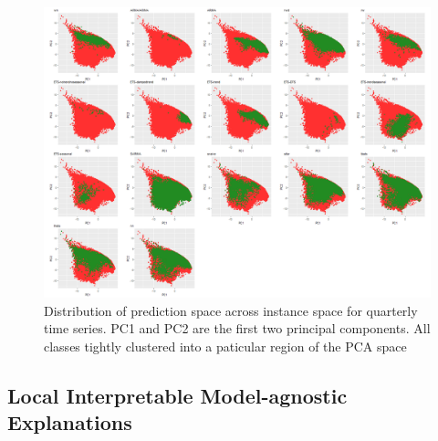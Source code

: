 \documentclass[11pt,a4paper,]{article}
\begin{document}
\begin{figure}
\centering
\includegraphics{figures/quarterlypca-1.png}
\caption{\label{fig:quarterlypca}Distribution of prediction space across
instance space for quarterly time series. PC1 and PC2 are the first two
principal components. All classes tightly clustered into a paticular
region of the PCA space}
\end{figure}

\subsection{Local Interpretable Model-agnostic
Explanations}\label{local-interpretable-model-agnostic-explanations}
\end{document}
